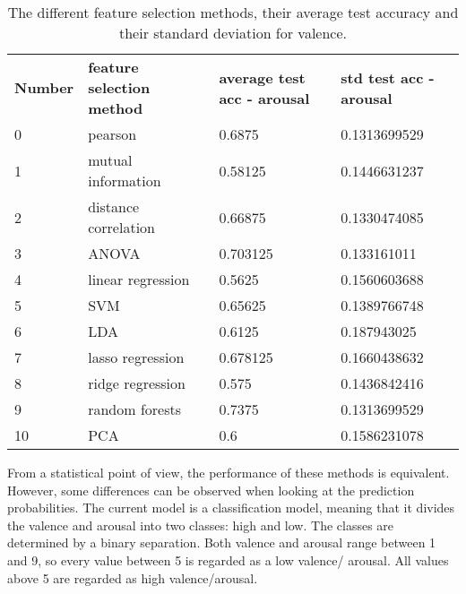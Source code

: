 \begin{table}[H]
\centering
\begin{tabular}{llll}
\textbf{Number} & \textbf{feature selection method} & \textbf{average test acc - arousal} & \textbf{std test acc - arousal} \\
0               & pearson                           & 0.6875                              & 0.1313699529                    \\
1               & mutual information                & 0.58125                             & 0.1446631237                    \\
2               & distance correlation              & 0.66875                             & 0.1330474085                    \\
3               & ANOVA                             & 0.703125                            & 0.133161011                     \\
4               & linear regression                 & 0.5625                              & 0.1560603688                    \\
5               & SVM                               & 0.65625                             & 0.1389766748                    \\
6               & LDA                               & 0.6125                              & 0.187943025                     \\
7               & lasso regression                  & 0.678125                            & 0.1660438632                    \\
8               & ridge regression                  & 0.575                               & 0.1436842416                    \\
9               & random forests                    & 0.7375                              & 0.1313699529                    \\
10              & PCA                               & 0.6                                 & 0.1586231078                   
\end{tabular}
\caption{The different feature selection methods, their average test accuracy and their standard deviation for valence\label{accCompLblvalence}.}
\end{table}

From a statistical point of view, the performance of these methods is equivalent. However, some differences can be observed when looking at the prediction probabilities. The current model is a classification model, meaning that it divides the valence and arousal into two classes: high and low. The classes are determined by a binary separation. Both valence and arousal range between 1 and 9, so every value between 5 is regarded as a low valence/ arousal. All values above 5 are regarded as high valence/arousal.

